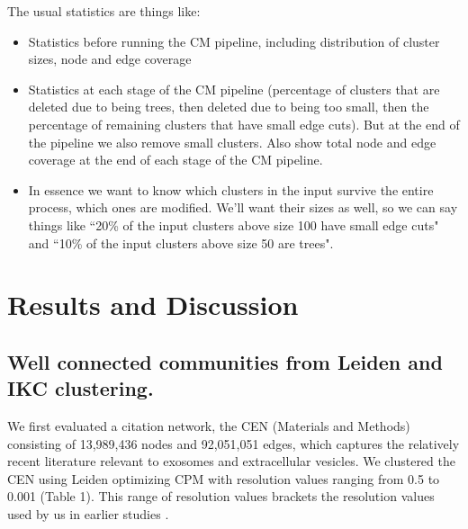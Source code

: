\documentclass[12pt, oneside]{article}   	%
\begin{document}
\noindent
The usual statistics are things like:
\begin{itemize}
\item Statistics before running the CM pipeline, including distribution of cluster sizes, node and edge coverage 
\item Statistics at each stage of the CM pipeline (percentage of clusters that are deleted due to being trees,
then deleted due to being too small, then the percentage of remaining clusters  that have small edge cuts).
But at the end of the pipeline we also remove small clusters.  
Also show total node and edge coverage at the end of each stage of the CM pipeline. 
\item 
In essence we want to know which clusters in the input survive the entire process, which ones are modified. 
We'll want their sizes as well, so we can say things like ``20\% of the input clusters above size 100 have small edge cuts" and
``10\% of the input clusters above size 50 are trees".
\end{itemize}

\section{Results and Discussion}

\subsection{Well connected communities from Leiden and IKC clustering.}

We first evaluated a citation network, the CEN (Materials and Methods) consisting of 13,989,436 nodes and 92,051,051 edges, which captures the relatively recent literature relevant to exosomes and extracellular vesicles. We clustered the CEN using Leiden optimizing CPM with resolution values ranging from 0.5 to 0.001 (Table 1). This range of resolution values brackets the resolution values used by us in earlier studies \citep{Wedell2022,Jakatdar_2022}. 
\end{document}
